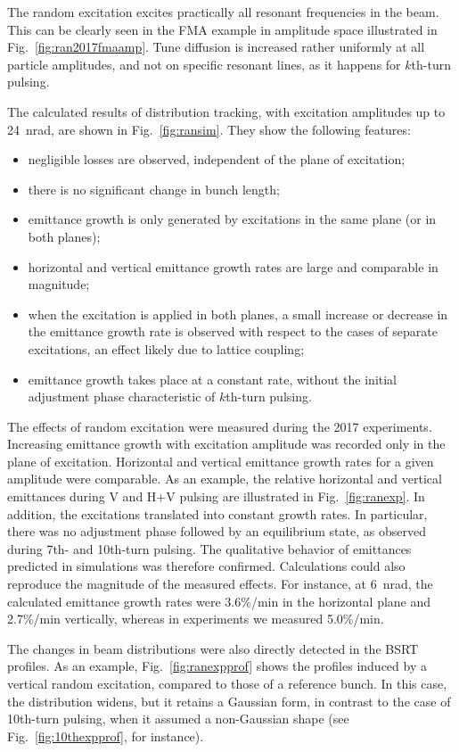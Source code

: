 \documentclass[aps
,prstab
,reprint
,longbibliography
,preprintnumbers
,showkeys
,amsfonts,amssymb,amsmath
,floatfix
]{revtex4-1}
\newcommand{\kthtp}{$k$th-turn pulsing}
\newcommand{\tenthtp}{10th-turn pulsing}
\begin{document}
The random excitation excites practically all resonant frequencies in
the beam.  This can be clearly seen in the FMA example in amplitude
space illustrated in Fig.~\ref{fig:ran2017fmaamp}. Tune diffusion is
increased rather uniformly at all particle amplitudes, and not on
specific resonant lines, as it happens for \kthtp.


The calculated results of distribution tracking, with excitation
amplitudes up to 24~nrad, are shown in
Fig.~\ref{fig:ransim}. They show the following features:
%
\begin{itemize}
\item negligible losses are observed, independent of the plane of
  excitation;
\item there is no significant change in bunch length;
\item emittance growth is only generated by excitations in the same
  plane (or in both planes);
\item horizontal and vertical emittance growth rates are large and
  comparable in magnitude;
\item when the excitation is applied in both planes, a small increase
  or decrease in the emittance growth rate is observed with respect to
  the cases of separate excitations, an effect likely due to lattice
  coupling;
\item emittance growth takes place at a constant rate, without the
  initial adjustment phase characteristic of \kthtp.
\end{itemize}

The effects of random excitation were measured during the 2017
experiments. Increasing emittance growth with excitation amplitude was
recorded only in the plane of excitation. Horizontal and vertical
emittance growth rates for a given amplitude were comparable. As an
example, the relative horizontal and vertical emittances during V and
H+V pulsing are illustrated in Fig.~\ref{fig:ranexp}. In addition, the
excitations translated into constant growth rates. In particular,
there was no adjustment phase followed by an equilibrium state, as
observed during 7th- and \tenthtp. The qualitative behavior of
emittances predicted in simulations was therefore confirmed.
Calculations could also reproduce the magnitude of the measured
effects. For instance, at 6~nrad, the calculated emittance growth
rates were 3.6\%/min in the horizontal plane and 2.7\%/min vertically,
whereas in experiments we measured 5.0\%/min.

The changes in beam distributions were also directly detected in the
BSRT profiles. As an example, Fig.~\ref{fig:ranexpprof} shows the
profiles induced by a vertical random excitation, compared to those of
a reference bunch. In this case, the distribution widens, but it
retains a Gaussian form, in contrast to the case of \tenthtp, when it
assumed a non-Gaussian shape (see Fig.~\ref{fig:10thexpprof}, for
instance).
\end{document}
